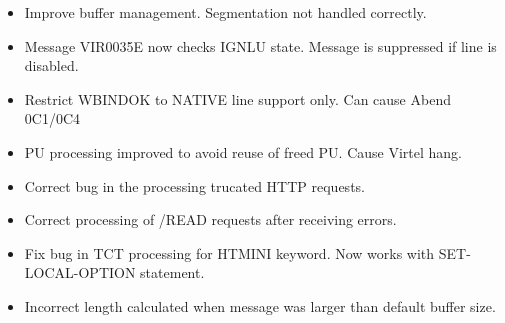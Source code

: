 \documentclass[letterpaper,10pt,english]{sphinxmanual}
\begin{document}
\begin{itemize}
\item {} 
Improve buffer management. Segmentation not handled correctly.

\end{itemize}

\begin{itemize}
\item {} 
Message VIR0035E now checks IGNLU state. Message is suppressed if line is disabled.

\end{itemize}

\begin{itemize}
\item {} 
Restrict WBINDOK to NATIVE line support only. Can cause Abend 0C1/0C4

\end{itemize}

\begin{itemize}
\item {} 
PU processing improved to avoid reuse of freed PU. Cause Virtel hang.

\end{itemize}

\begin{itemize}
\item {} 
Correct bug in the processing trucated HTTP requests.

\end{itemize}

\begin{itemize}
\item {} 
Correct processing of /READ requests after receiving errors.

\end{itemize}

\begin{itemize}
\item {} 
Fix bug in TCT processing for HTMINI keyword. Now works with SET-LOCAL-OPTION statement.

\end{itemize}

\begin{itemize}
\item {} 
Incorrect length calculated when message was larger than default buffer size.

\end{itemize}
\end{document}
